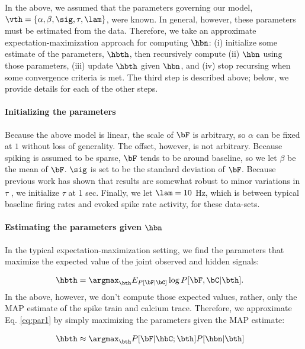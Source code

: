 In the above, we assumed that the parameters governing our model, $\vth=\{\alpha, \beta, \sig, \tau, \lam\}$, were known. In general, however, these parameters must be estimated from the data. Therefore, we take an approximate expectation-maximization approach for computing $\hbn$: (i) initialize some estimate of the parameters, $\hbth$, then recursively compute (ii) $\hbn$ using those parameters, (iii) update $\hbth$ given $\hbn$, and (iv) stop recursing when some convergence criteria is met.  The third step is described above; below, we provide details for each of the other steps.

\paragraph{Initializing the parameters}

Because the above model is linear, the scale of $\bF$ is arbitrary, so $\alpha$ can be fixed at $1$ without loss of generality.  The offset, however, is not arbitrary.  Because spiking is assumed to be sparse, $\bF$ tends to be around baseline, so we let $\beta$ be the mean of $\bF$.  $\sig$ is set to be the standard deviation of $\bF$.  Because previous work has shown that results are somewhat robust to minor variations in $\tau$ \cite{YaksiFriedrich06}, we initialize $\tau$ at 1 sec.  Finally, we let $\lam=10$ Hz, which is between typical baseline firing rates and evoked spike rate activity, for these data-sets.

\paragraph{Estimating the parameters given $\hbn$}

In the typical expectation-maximization setting, we find the parameters that maximize the expected value of the joint observed and hidden signals:

\begin{align} \label{eq:par1}
\hbth &= \argmax_{\bth} E_{P[\bF | \bC]} \log P[\bF, \bC | \bth].
\end{align}
In the above, however, we don't compute those expected values, rather, only the MAP estimate of the spike train and calcium trace.  Therefore, we approximate Eq. \eqref{eq:par1} by simply maximizing the parameters given the MAP estimate:

\begin{align} \label{eq:par2}
\hbth &\approx \argmax_{\bth} P[\bF| \hbC; \bth] P[\hbn | \bth]
\end{align}

